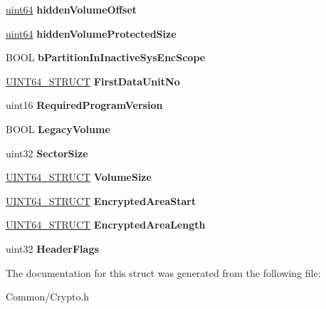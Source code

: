\begin{DoxyCompactItemize}
\item 
\mbox{\label{struct_c_r_y_p_t_o___i_n_f_o__t_a860caa7ac019f77d9d2af4678f868e5d}} 
\hyperlink{union_u_i_n_t64___s_t_r_u_c_t}{uint64} {\bfseries hidden\+Volume\+Offset}
\item 
\mbox{\label{struct_c_r_y_p_t_o___i_n_f_o__t_a2b4fb7d433fc1d286ceac8d3cda24744}} 
\hyperlink{union_u_i_n_t64___s_t_r_u_c_t}{uint64} {\bfseries hidden\+Volume\+Protected\+Size}
\item 
\mbox{\label{struct_c_r_y_p_t_o___i_n_f_o__t_a7f72494289bfb53afacbbfb8d14931b4}} 
B\+O\+OL {\bfseries b\+Partition\+In\+Inactive\+Sys\+Enc\+Scope}
\item 
\mbox{\label{struct_c_r_y_p_t_o___i_n_f_o__t_a8e5f17b523774b6eaabf506cf55d2f1e}} 
\hyperlink{union_u_i_n_t64___s_t_r_u_c_t}{U\+I\+N\+T64\+\_\+\+S\+T\+R\+U\+CT} {\bfseries First\+Data\+Unit\+No}
\item 
\mbox{\label{struct_c_r_y_p_t_o___i_n_f_o__t_abeefd7ce1e2acb202d9b04caacb1b57b}} 
uint16 {\bfseries Required\+Program\+Version}
\item 
\mbox{\label{struct_c_r_y_p_t_o___i_n_f_o__t_a9af407fb5ff31320aac48db51f18441e}} 
B\+O\+OL {\bfseries Legacy\+Volume}
\item 
\mbox{\label{struct_c_r_y_p_t_o___i_n_f_o__t_aae4842cd477f16d3f16353b95454bc23}} 
uint32 {\bfseries Sector\+Size}
\item 
\mbox{\label{struct_c_r_y_p_t_o___i_n_f_o__t_a04051a83a31c7db812e4eebd44418a77}} 
\hyperlink{union_u_i_n_t64___s_t_r_u_c_t}{U\+I\+N\+T64\+\_\+\+S\+T\+R\+U\+CT} {\bfseries Volume\+Size}
\item 
\mbox{\label{struct_c_r_y_p_t_o___i_n_f_o__t_ac7d3bfbf9334e90d0bfa6bd085b5e297}} 
\hyperlink{union_u_i_n_t64___s_t_r_u_c_t}{U\+I\+N\+T64\+\_\+\+S\+T\+R\+U\+CT} {\bfseries Encrypted\+Area\+Start}
\item 
\mbox{\label{struct_c_r_y_p_t_o___i_n_f_o__t_a2f5e3c4a3cd32d1b2c271785b5a49786}} 
\hyperlink{union_u_i_n_t64___s_t_r_u_c_t}{U\+I\+N\+T64\+\_\+\+S\+T\+R\+U\+CT} {\bfseries Encrypted\+Area\+Length}
\item 
\mbox{\label{struct_c_r_y_p_t_o___i_n_f_o__t_ac9fda51ca12822f5f34153bf60120f24}} 
uint32 {\bfseries Header\+Flags}
\end{DoxyCompactItemize}


The documentation for this struct was generated from the following file\+:\begin{DoxyCompactItemize}
\item 
Common/Crypto.\+h\end{DoxyCompactItemize}
